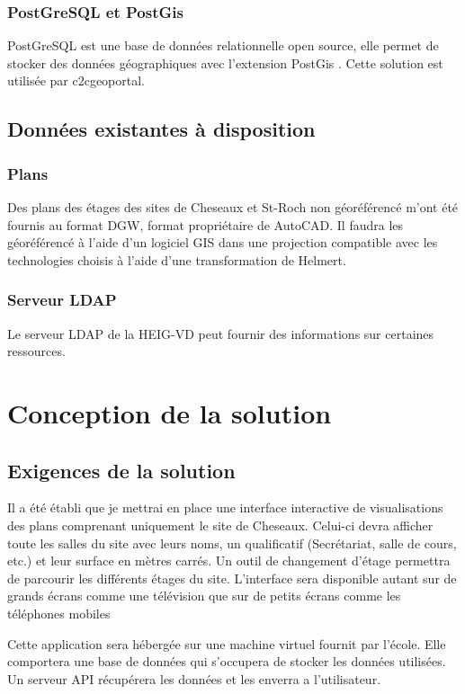 \documentclass[
    iai, %
    il, %
]{heig-tb}
\begin{document}
\subsection{PostGreSQL et PostGis}
PostGreSQL est une base de données relationnelle open source, elle permet de stocker des données géographiques avec l'extension PostGis  \cite{postgis}.
Cette solution est utilisée par c2cgeoportal.

\section{Données existantes à disposition}
\subsection{Plans}
Des plans des étages des sites de Cheseaux et St-Roch non géoréférencé m'ont été fournis au format DGW, format propriétaire de AutoCAD.
Il faudra les géoréférencé à l'aide d'un logiciel GIS dans une projection compatible avec les technologies choisis à l'aide d'une transformation de Helmert.

\subsection{Serveur LDAP}
Le serveur LDAP de la HEIG-VD peut fournir des informations sur certaines ressources.




\chapter{Conception de la solution}
\section{Exigences de la solution}
Il a été établi que je mettrai en place une interface interactive de visualisations des plans comprenant uniquement le site de Cheseaux.
Celui-ci devra afficher toute les salles du site avec leurs noms, un qualificatif (Secrétariat, salle de cours, etc.) et leur surface en mètres carrés.
Un outil de changement d'étage permettra de parcourir les différents étages du site.
L'interface sera disponible autant sur de grands écrans comme une télévision que sur de petits écrans comme les téléphones mobiles

Cette application sera hébergée sur une machine virtuel fournit par l'école.
Elle comportera une base de données qui s'occupera de stocker les données utilisées.
Un serveur API récupérera les données et les enverra a l'utilisateur.
\end{document}
